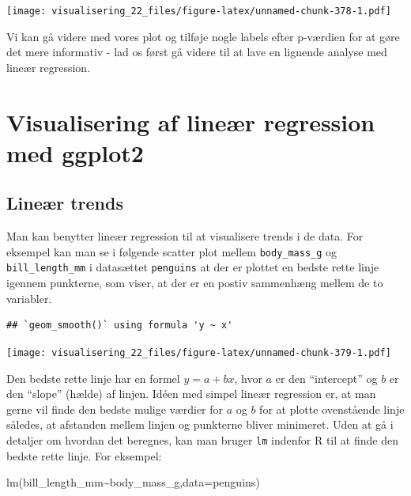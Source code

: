 \documentclass[
]{book}
\newenvironment{Shaded}{\begin{snugshade}}{\end{snugshade}}
\newcommand{\AttributeTok}[1]{\textcolor[rgb]{0.77,0.63,0.00}{#1}}
\newcommand{\FunctionTok}[1]{\textcolor[rgb]{0.00,0.00,0.00}{#1}}
\newcommand{\NormalTok}[1]{#1}
\newcommand{\SpecialCharTok}[1]{\textcolor[rgb]{0.00,0.00,0.00}{#1}}
\begin{document}
\texttt{[image: visualisering\_22\_files/figure-latex/unnamed-chunk-378-1.pdf]}

Vi kan gå videre med vores plot og tilføje nogle labels efter p-værdien for at gøre det mere informativ - lad os først gå videre til at lave en lignende analyse med lineær regression.

\hypertarget{visualisering-af-lineuxe6r-regression-med-ggplot2}{%
\section{Visualisering af lineær regression med ggplot2}\label{visualisering-af-lineuxe6r-regression-med-ggplot2}}

\hypertarget{lineuxe6r-trends}{%
\subsection{Lineær trends}\label{lineuxe6r-trends}}

Man kan benytter lineær regression til at visualisere trends i de data. For eksempel kan man se i følgende scatter plot mellem \texttt{body\_mass\_g} og \texttt{bill\_length\_mm} i datasættet \texttt{penguins} at der er plottet en bedste rette linje igennem punkterne, som viser, at der er en postiv sammenhæng mellem de to variabler.

\begin{verbatim}
## `geom_smooth()` using formula 'y ~ x'
\end{verbatim}

\texttt{[image: visualisering\_22\_files/figure-latex/unnamed-chunk-379-1.pdf]}

Den bedste rette linje har en formel \(y = a + bx\), hvor \(a\) er den ``intercept'' og \(b\) er den ``slope'' (hælde) af linjen. Idéen med simpel lineær regression er, at man gerne vil finde den bedste mulige værdier for \(a\) og \(b\) for at plotte ovenstående linje således, at afstanden mellem linjen og punkterne bliver minimeret. Uden at gå i detaljer om hvordan det beregnes, kan man bruger \texttt{lm} indenfor R til at finde den bedste rette linje. For eksempel:

\begin{Shaded}
\begin{Highlighting}[]
\FunctionTok{lm}\NormalTok{(bill\_length\_mm}\SpecialCharTok{\textasciitilde{}}\NormalTok{body\_mass\_g,}\AttributeTok{data=}\NormalTok{penguins)}
\end{Highlighting}
\end{Shaded}
\end{document}
